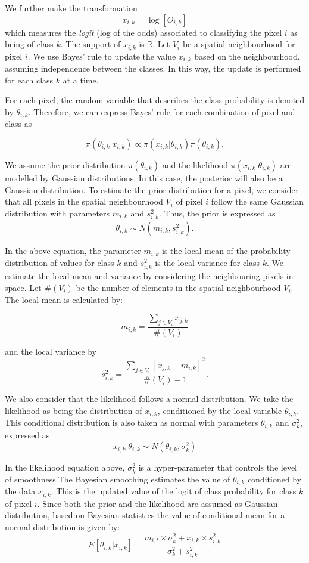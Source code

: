 \documentclass[a4paper,]{tufte-book}
\begin{document}
We further make the transformation
\[
    x_{i,k} = \log [O_{i,k}]
\]
which measures the \emph{logit} (log of the odds) associated to classifying the pixel \(i\) as being of class \(k\). The support of \(x_{i,k}\) is \(\mathbb{R}\). Let \(V_{i}\) be a spatial neighbourhood for pixel \(i\). We use Bayes' rule to update the value \(x_{i,k}\) based on the neighbourhood, assuming independence between the classes. In this way, the update is performed for each class \(k\) at a time.

For each pixel, the random variable that describes the class probability is denoted by \(\theta_{i,k}\). Therefore, we can express Bayes' rule for each combination of pixel and class as

\[
\pi(\theta_{i,k}|x_{i,k}) \propto \pi(x_{i,k}|\theta_{i,k})\pi(\theta_{i,k}).   
\]

We assume the prior distribution \(\pi(\theta_{i,k})\) and the likelihood \(\pi(x_{i,k}|\theta_{i,k})\) are modelled by Gaussian distributions. In this case, the posterior will also be a Gaussian distribution. To estimate the prior distribution for a pixel, we consider that all pixels in the spatial neighbourhood \(V_{i}\) of pixel \(i\) follow the same Gaussian distribution with parameters \(m_{i,k}\) and \(s^2_{i,k}\). Thus, the prior is expressed as
\[
\theta_{i,k} \sim N(m_{i,k}, s^2_{i,k}).    
\]

In the above equation, the parameter \(m_{i,k}\) is the local mean of the probability distribution of values for class \(k\) and \(s^2_{i,k}\) is the local variance for class \(k\). We estimate the local mean and variance by considering the neighbouring pixels in space. Let \(\#(V_{i})\) be the number of elements in the spatial neighbourhood \(V _{i}\). The local mean is calculated by:

\[
    m_{i,k} = \frac{\displaystyle\sum_{j \in V_{i}} x_{j,k}}{\#(V_{i})}
\]

and the local variance by
\[
s^2_{i,k} = \frac{\displaystyle\sum_{j \in V_{i}} [x_{j,k} - m_{i,k}]^2}{\#(V_{i})-1}.  
\]

We also consider that the likelihood follows a normal distribution. We take the likelihood as being the distribution of \(x_{i,k}\), conditioned by the local variable \(\theta_{i,k}\). This conditional distribution is also taken as normal with parameters \(\theta_{i,k}\) and \(\sigma^2_{k}\), expressed as
\[
x_{i,k} | \theta_{i,k} \sim N(\theta_{i,k}, \sigma^2_{k})
\]

In the likelihood equation above, \(\sigma^2_{k}\) is a hyper-parameter that controls the level of smoothness.The Bayesian smoothing estimates the value of \(\theta _{i,k}\) conditioned by the data \(x_{i,k}\). This is the updated value of the logit of class probability for class \(k\) of pixel \(i\). Since both the prior and the likelihood are assumed as Gaussian distribution, based on Bayesian statistics the value of conditional mean for a normal distribution is given by:
\[
{E}[\theta_{i,k} | x_{i,k}] =
\frac{m_{i,t} \times \sigma^2_{k} + 
x_{i,k} \times s^2_{i,k}}{ \sigma^2_{k} +s^2_{i,k}} 
\]
\end{document}
